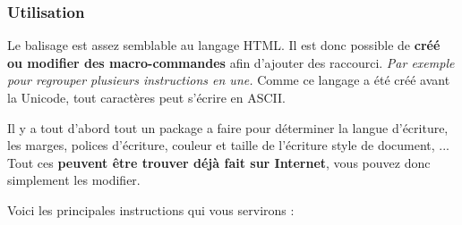 \subsubsection{Utilisation}

Le balisage est assez semblable au langage HTML. Il est donc possible de \textbf{créé ou modifier des macro-commandes} afin d'ajouter des raccourci. \textit{Par exemple pour regrouper plusieurs instructions en une.}
Comme ce langage a été créé avant la Unicode, tout caractères peut s'écrire en ASCII. 

Il y a tout d'abord tout un package a faire pour déterminer la langue d’écriture, les marges, polices d’écriture, couleur et taille de l’écriture style de document, ...
Tout ces \textbf{peuvent être trouver déjà fait sur Internet}, vous pouvez donc simplement les modifier.


Voici les principales instructions qui vous servirons : 

